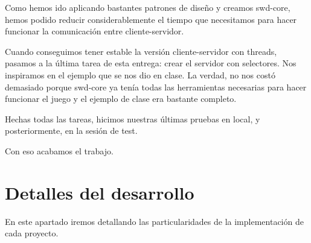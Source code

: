 Como hemos ido aplicando bastantes patrones de diseño y creamos swd-core, hemos podido reducir considerablemente el tiempo que necesitamos para hacer funcionar la comunicación entre cliente-servidor.

Cuando conseguimos tener estable la versión cliente-servidor con threads, pasamos a la última tarea de esta entrega: crear el servidor con selectores. Nos inspiramos en el ejemplo que se nos dio en clase. La verdad, no nos costó demasiado porque swd-core ya tenía todas las herramientas necesarias para hacer funcionar el juego y el ejemplo de clase era bastante completo.

Hechas todas las tareas, hicimos nuestras últimas pruebas en local, y posteriormente, en la sesión de test. 

Con eso acabamos el trabajo.

\newpage
\section*{Detalles del desarrollo}
En este apartado iremos detallando las particularidades de la implementación de cada proyecto.

